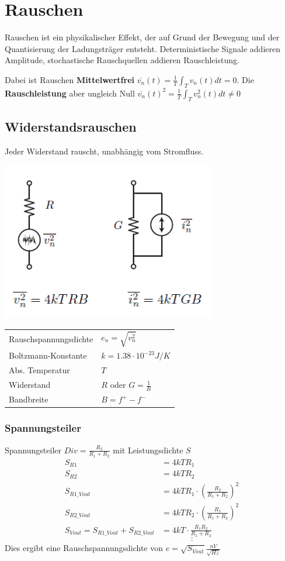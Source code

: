 \section{Rauschen}
Rauschen ist ein physikalischer Effekt, der auf Grund der Bewegung und der Quantisierung der Ladungsträger entsteht. Deterministische Signale addieren Amplitude, stochastische Rauschquellen addieren Rauschleistung.

Dabei ist Rauschen \textbf{Mittelwertfrei} $\overline{v_n}(t) = \frac{1}{T}\int_{T}^{}v_n(t)dt = 0$. Die \textbf{Rauschleistung} aber ungleich Null $\overline{v_n}(t)^2 = \frac{1}{T}\int_{T}^{}v_n^2(t)dt \neq 0$

\subsection{Widerstandsrauschen}
Jeder Widerstand rauscht, unabhängig vom Stromfluss.
\begin{center}
	\includegraphics[width=0.6\columnwidth]{Images/widerstandsrauschen}
	\begin{tabular}{ll}
		Rauschspannungsdichte & $e_n = \sqrt{\overline{v_n^2}}$ \\
		Boltzmann-Konstante & $k = 1.38\cdot 10^{-23}J/K$ \\
		Abs. Temperatur & $T$ \\
		Widerstand & $R$ oder $G = \frac{1}{R}$ \\
		Bandbreite & $B = f^+ - f^-$
	\end{tabular}
\end{center}

\subsubsection{Spannungsteiler}
Spannungsteiler $Div = \frac{R_2}{R_1 + R_2}$ mit Leistungsdichte $S$\\
\begin{align*}
	S_{R1} &= 4kTR_1 \\
	S_{R2} &= 4kTR_2 \\
	S_{R1\_Vout} &= 4kTR_1 \cdot \left(\frac{R_2}{R_1 + R_2}\right)^2 \\
	S_{R2\_Vout} &= 4kTR_2  \cdot \left(\frac{R_1}{R_1 + R_2}\right)^2  \\	
	S_{Vout} = S_{R1\_Vout} + S_{R2\_Vout} &= \underline{\underline{4kT\cdot \frac{R_1R_2}{R_1 + R_2}}}
\end{align*}
Dies ergibt eine Rauschspannungsdichte von $e = \sqrt{S_{Vout}}\frac{nV}{\sqrt{Hz}}$

